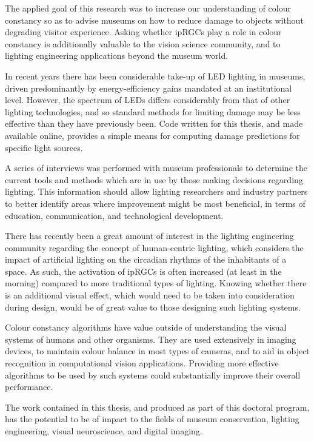 \begin{impactstatement}

\glsresetall

The applied goal of this research was to increase our understanding of colour constancy so as to advise museums on how to reduce damage to objects without degrading visitor experience. Asking whether \glspl{ipRGC} play a role in colour constancy is additionally valuable to the vision science community, and to lighting engineering applications beyond the museum world.

In recent years there has been considerable take-up of \gls{LED} lighting in museums, driven predominantly by energy-efficiency gains mandated at an institutional level. However, the spectrum of \glspl{LED} differs considerably from that of other lighting technologies, and so standard methods for limiting damage may be less effective than they have previously been. Code written for this thesis, and made available online, provides a simple means for computing damage predictions for specific light sources. 

A series of interviews was performed with museum professionals to determine the current tools and methods which are in use by those making decisions regarding lighting. This information should allow lighting researchers and industry partners to better identify areas where improvement might be most beneficial, in terms of education, communication, and technological development.

There has recently been a great amount of interest in the lighting engineering community regarding the concept of human-centric lighting, which considers the impact of artificial lighting on the circadian rhythms of the inhabitants of a space. As such, the activation of \glspl{ipRGC} is often increased (at least in the morning) compared to more traditional types of lighting. Knowing whether there is an additional visual effect, which would need to be taken into consideration during design, would be of great value to those designing such lighting systems.

Colour constancy algorithms have value outside of understanding the visual systems of humans and other organisms. They are used extensively in imaging devices, to maintain colour balance in most types of cameras, and to aid in object recognition in computational vision applications. Providing more effective algorithms to be used by such systems could substantially improve their overall performance.

The work contained in this thesis, and produced as part of this doctoral program, has the potential to be of impact to the fields of museum conservation, lighting engineering, visual neuroscience, and digital imaging.  




\end{impactstatement}
